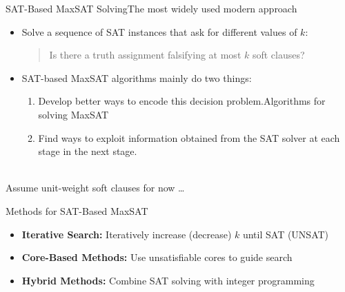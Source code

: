 \documentclass[t,english]{sdqbeamer}
\begin{document}
\begin{frame}{SAT-Based MaxSAT Solving}{The most widely used modern approach}
\begin{itemize}\itemsep1ex
	\item Solve a sequence of SAT instances that ask for different values of $k$:
	\begin{quote}
	Is there a truth assignment falsifying at most $k$ soft clauses?
	\end{quote}
	\item SAT-based MaxSAT algorithms mainly do two things:\\[1ex]
	\begin{enumerate}\itemsep1em
	\item Develop better ways to encode this decision problem.Algorithms for solving MaxSAT
\
	\item Find ways to exploit information obtained from the SAT solver at each stage in the next stage.
	\end{enumerate}
\end{itemize}~\\
Assume unit-weight soft clauses for now \dots

\begin{block}{Methods for SAT-Based MaxSAT}
\begin{itemize}\itemsep1em
  \item \textbf{Iterative Search:} Iteratively increase (decrease) $k$ until SAT (UNSAT)
  \item \textbf{Core-Based Methods:} Use unsatisfiable cores to guide search
  \item \textbf{Hybrid Methods:} Combine SAT solving with integer programming
\end{itemize}
\end{block}
\end{frame}
\end{document}
